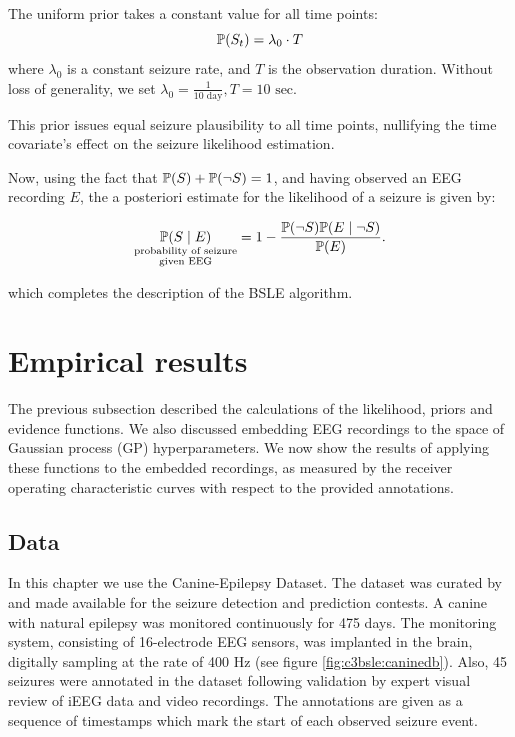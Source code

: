 \begin{definition}
The uniform prior takes a constant value for all time points: 
    \begin{equation}
    \label{eq:c3bsle:uniform_prior}
    \mathbb{P}(S_t) = \lambda_0 \cdot T
    \end{equation}
    where $\lambda_0$ is a constant seizure rate, and $T$ is the observation duration.
    Without loss of generality, we set $\lambda_0 = \frac{1}{10 \text{ day}}, T = 10 \text{ sec}$.
\end{definition}
This prior issues equal seizure plausibility to all time points, nullifying the time covariate's effect on the seizure likelihood estimation.

Now, using the fact that $\mathbb{P}(S) + \mathbb{P}(\neg S) = 1$, and having observed an EEG recording $E$, the a posteriori estimate for the likelihood of a seizure is given by:

\begin{equation}
\label{eq:c3bsle:posterior}
    \underset{{\substack{\text{probability of seizure}\\\text{given EEG}}}}{\mathbb{P}(S \mid E)} = 1 - \frac{\mathbb{P}(\neg S) \mathbb{P}(E \mid \neg S)}{\mathbb{P} (E)}.
\end{equation}

which completes the description of the BSLE algorithm.

\clearpage
\section{Empirical results}
\label{sec:c3bsle:results}
The previous subsection described the calculations of the likelihood, priors and evidence functions. We also discussed embedding EEG recordings to the space of Gaussian process (GP) hyperparameters. We now show the results of applying these functions to the embedded recordings, as measured by the receiver operating characteristic curves with respect to the provided annotations.

\subsection{Data}
In this chapter we use the Canine-Epilepsy Dataset. The dataset was curated by \citet{davis2011novel} and made available for the \citet{kaggle2014contests} seizure detection and prediction contests. A canine with natural epilepsy was monitored continuously for 475 days. The monitoring system, consisting of 16-electrode EEG sensors, was implanted in the brain, digitally sampling at the rate of 400 Hz (see figure \ref{fig:c3bsle:caninedb}). Also, 45 seizures were annotated in the dataset following validation by expert visual review of iEEG data and video recordings. The annotations are given as a sequence of timestamps which mark the start of each observed seizure event.


